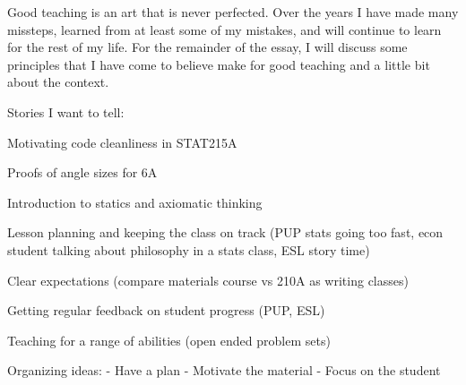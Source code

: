 \documentclass{article}
\begin{document}
Good teaching is an art that is never perfected.  Over the years I have made
many missteps, learned from at least some of my mistakes, and will continue to
learn for the rest of my life.  For the remainder of the essay, I will discuss
some principles that I have come to believe make for good teaching and a
little bit about the context.

Stories I want to tell:

Motivating code cleanliness in STAT215A

Proofs of angle sizes for 6A

Introduction to statics and axiomatic thinking

Lesson planning and keeping the class on track (PUP stats going too fast,
econ student talking about philosophy in a stats class, ESL story time)

Clear expectations (compare materials course vs 210A as writing classes)

Getting regular feedback on student progress (PUP, ESL)

Teaching for a range of abilities (open ended problem sets)



Organizing ideas:
- Have a plan
- Motivate the material
- Focus on the student
\end{document}
